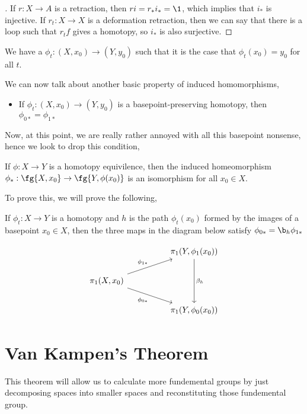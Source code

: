 \begin{proof}[]
  If $r : X \to A$ is a retraction, then $ri = r_*i_* = \1$, which implies that $i_*$ is injective. If $r_t : X \to X$ is a deformation retraction, then we can say that there is a loop such that $r_t f$ gives a homotopy, so $i_*$ is also surjective.
\end{proof}

\begin{ndefi}
  We have a $\phi_t : (X, x_0) \to (Y, y_0)$ such that it is the case that $\phi_t (x_0) = y_0$ for all $t$.
\end{ndefi}

\begin{pprop}
  We can now talk about another basic property of induced homomorphisms,
  \begin{itemize}
    \item If $\phi_t : (X, x_0) \to (Y, y_0)$ is a basepoint-preserving homotopy, then $\phi_{0*} = \phi_{1*}$
  \end{itemize}
\end{pprop}

Now, at this point, we are really rather annoyed with all this basepoint nonsense, hence we look to drop this condition,

\begin{nprop}
  If $\phi : X\to Y$ is a homotopy equivilence, then the induced homeomorphism $\phi_* : \fg { X, x_0} \to \fg {Y, \phi (x_0)}$ is an isomorphism for all $x_0 \in X$.
\end{nprop}
To prove this, we will prove the following,
\begin{nlemma}[]
  If $\phi_t : X \to Y$ is a homotopy and $h$ is the path $\phi_t(x_0)$ formed by the images of a basepoint $x_0\in X$, then the three maps in the diagram below satisfy $\phi_{0*} = \b_h \phi_{1*}$
\end{nlemma}

\[\begin{tikzcd}
	&& {\pi_1 (Y, \phi_1(x_0))} \\
	{\pi_1 (X, x_0)} \\
	&& {\pi_1 (Y, \phi_0(x_0))}
	\arrow["{\phi_{1*}}", from=2-1, to=1-3]
	\arrow["{\phi_{0*}}"', from=2-1, to=3-3]
	\arrow["{\beta_h}", from=1-3, to=3-3]
\end{tikzcd}\]

\section{Van Kampen's Theorem}
This theorem will allow us to calculate more fundemental groups by just decomposing spaces into smaller spaces and reconstituting those fundemental group. \\

